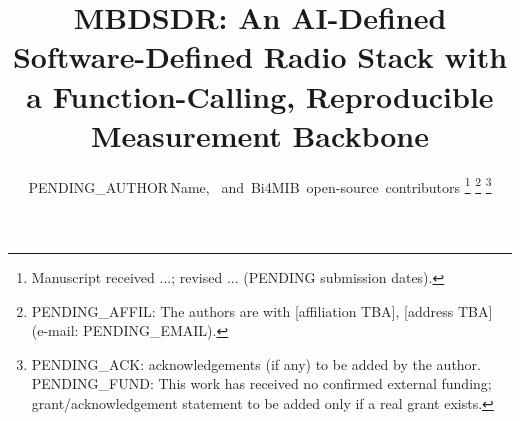 \documentclass[journal]{IEEEtran}
\begin{document}
\title{MBDSDR: An AI-Defined Software-Defined Radio Stack with a
Function-Calling, Reproducible Measurement Backbone}

\author{PENDING\_AUTHOR\,Name,~%
and~Bi4MIB~open-source~contributors%
\thanks{Manuscript received ...; revised ... (PENDING submission dates).}
\thanks{PENDING\_AFFIL: The authors are with [affiliation TBA],
[address TBA] (e-mail: PENDING\_EMAIL).}
\thanks{PENDING\_ACK: acknowledgements (if any) to be added by the author.
PENDING\_FUND: This work has received no confirmed external funding;
grant/acknowledgement statement to be added only if a real grant exists.}}

\maketitle
\end{document}
